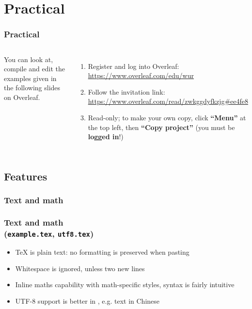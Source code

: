 \documentclass[xetex,colorlinks]{beamer} %
\begin{document}
  \section{Practical}
  \begin{frame}
    \frametitle{Practical}
    \begin{columns}
      You can look at, compile and edit the examples given in the following slides on Overleaf.
      \begin{enumerate}
      \item Register and log into Overleaf: \href{https://www.overleaf.com/edu/wur}{https://www.overleaf.com/edu/wur}
      \item Follow the invitation link: {\scriptsize \href{https://www.overleaf.com/read/zwkggdyfkzjg\#ee4fe8}{https://www.overleaf.com/read/zwkggdyfkzjg\#ee4fe8}}
      \item Read-only; to make your own copy, click \textbf{``Menu''} at the top left, then \textbf{``Copy project''} (you must be \textbf{logged in}!)
      \end{enumerate}
    \end{columns}
  \end{frame}

  
  \subsection{Features}
  \subsubsection{Text and math}
  \begin{frame}
    \frametitle{Text and math \\ (\texttt{example.tex}, \texttt{utf8.tex})}
    \begin{itemize}
     \item \TeX{} is plain text: no formatting is preserved when pasting
     \item Whitespace is ignored, unless two new lines
     \item Inline maths capability with math-specific styles, syntax is fairly intuitive
     \item UTF-8 support is better in , e.g. text in Chinese
    \end{itemize}
  \end{frame}
  
\end{document}
